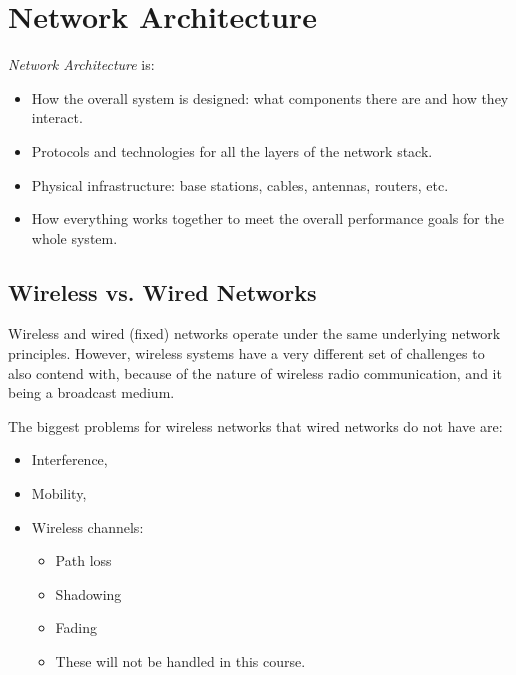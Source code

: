\section{Network Architecture}\label{sec:Network_Architecture}
\begin{definition}\label{def:Network_Architecture}
  \emph{Network Architecture} is:
  \begin{itemize}[noitemsep]
  \item How the overall system is designed: what components there are and how they interact.
  \item Protocols and technologies for all the layers of the network stack.
  \item Physical infrastructure: base stations, cables, antennas, routers, etc.
  \item How everything works together to meet the overall performance goals for the whole system.
  \end{itemize}
\end{definition}

\subsection{Wireless vs. Wired Networks}\label{subsec:Wireless_vs_Wired}
Wireless and wired (fixed) networks operate under the same underlying network principles.
However, wireless systems have a very different set of challenges to also contend with, because of the nature of wireless radio communication, and it being a broadcast medium.

The biggest problems for wireless networks that wired networks do not have are:
\begin{itemize}[noitemsep]
\item Interference, 
\item Mobility, 
\item Wireless channels:
  \begin{itemize}[noitemsep]
  \item Path loss
  \item Shadowing
  \item Fading
  \item These will not be handled in this course.
  \end{itemize}
\end{itemize}



